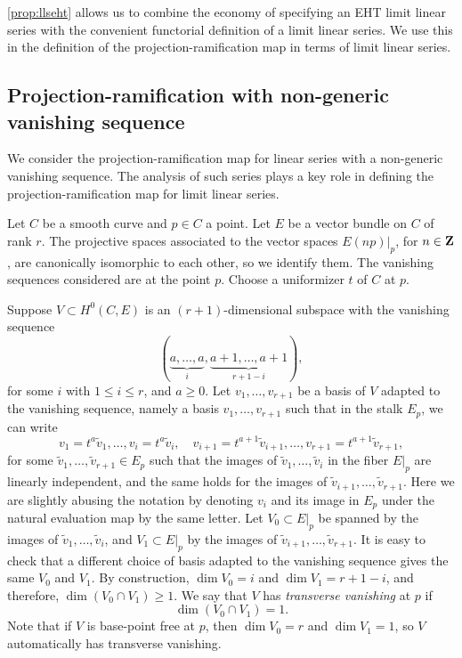 \documentclass[11pt,reqno]{amsart}
\theoremstyle{plain}
\theoremstyle{definition}
\theoremstyle{remark}
\numberwithin{equation}{section}
\numberwithin{equation}{section}
\begin{document}
\autoref{prop:llseht} allows us to combine the economy of specifying an EHT limit linear series with the convenient functorial definition of a limit linear series.
We use this in the definition of the projection-ramification map in terms of limit linear series.

\subsection{Projection-ramification with non-generic vanishing sequence}
\label{sec:prnodal}
We consider the projection-ramification map for linear series with a non-generic vanishing sequence.
The analysis of such series plays a key role in defining the projection-ramification map for limit linear series.

Let $C$ be a smooth curve and $p \in C$ a point.
Let $E$ be a vector bundle on $C$ of rank $r$.
The projective spaces associated to the vector spaces $E(np)|_p$, for $n \in {\bf Z}$, are canonically isomorphic to each other, so we identify them.
The vanishing sequences considered are at the point $p$.
Choose a uniformizer $t$ of $C$ at $p$.

Suppose $V \subset H^0(C, E)$ is an $(r+1)$-dimensional subspace with the vanishing sequence 
\begin{equation}\label{eqn:specialvs}
  (\underbrace{a, \dots, a}_{i}, \underbrace{a+1, \dots, a+1}_{r+1-i}),
\end{equation}
for some $i$ with $1 \leq i \leq r$, and $a \geq 0$.
Let $v_1, \dots, v_{r+1}$ be a basis of $V$ adapted to the vanishing sequence, namely a basis $v_1, \dots, v_{r+1}$ such that in the stalk $E_p$, we can write
\begin{equation}\label{eqn:basis}
  v_1 = t^a \widetilde v_1, \dots, v_{i} = t^a \widetilde v_i,\quad v_{i+1} = t^{a+1} \widetilde v_{i+1}, \dots, v_{r+1} = t^{a+1} \widetilde v_{r+1},
\end{equation}
for some $\widetilde v_1, \dots, \widetilde v_{r+1} \in E_p$ such that the images of $\widetilde v_1, \dots, \widetilde v_i$ in the fiber $E|_p$ are linearly independent, and the same holds for the images of $\widetilde v_{i+1}, \dots, \widetilde v_{r+1}$.
Here we are slightly abusing the notation by denoting $v_i$ and its image in $E_p$ under the natural evaluation map by the same letter.
Let $V_0 \subset E|_p$ be spanned by the images of $\widetilde v_1, \dots, \widetilde v_i$, and $V_1 \subset E|_p$ by the images of $\widetilde v_{i+1}, \dots, \widetilde v_{r+1}$.
It is easy to check that a different choice of basis adapted to the vanishing sequence gives the same $V_0$ and $V_1$.
By construction, $\dim V_0 = i$ and $\dim V_1 = r+1-i$, and therefore, $\dim (V_0 \cap V_1) \geq 1$.
We say that $V$ has \emph{transverse vanishing} at $p$ if 
\begin{equation}\label{eq:genericity}
  \dim (V_0 \cap V_1) = 1.
\end{equation}
Note that if $V$ is base-point free at $p$, then $\dim V_0 = r$ and $\dim V_1 = 1$, so $V$ automatically has transverse vanishing.
\end{document}
